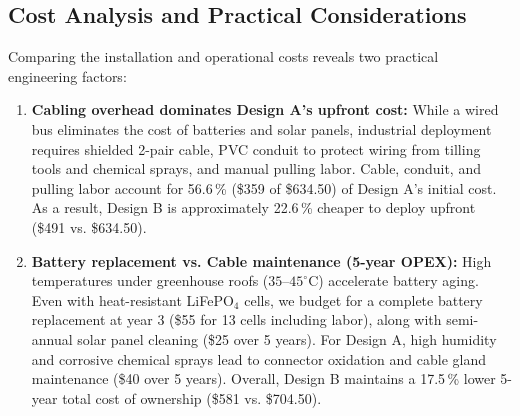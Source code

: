 \documentclass[11pt,a4paper]{report}
\begin{document}
\subsection{Cost Analysis and Practical Considerations}
Comparing the installation and operational costs reveals two practical engineering factors:
\begin{enumerate}
  \item \textbf{Cabling overhead dominates Design A's upfront cost:} While a wired bus eliminates the cost of batteries and solar panels, industrial deployment requires shielded 2-pair cable, PVC conduit to protect wiring from tilling tools and chemical sprays, and manual pulling labor. Cable, conduit, and pulling labor account for 56.6\,\% (\$359 of \$634.50) of Design A's initial cost. As a result, Design B is approximately 22.6\,\% cheaper to deploy upfront (\$491 vs. \$634.50).
  \item \textbf{Battery replacement vs. Cable maintenance (5-year OPEX):} High temperatures under greenhouse roofs ($35$--$45^\circ\text{C}$) accelerate battery aging. Even with heat-resistant LiFePO$_4$ cells, we budget for a complete battery replacement at year 3 (\$55 for 13 cells including labor), along with semi-annual solar panel cleaning (\$25 over 5 years). For Design A, high humidity and corrosive chemical sprays lead to connector oxidation and cable gland maintenance (\$40 over 5 years). Overall, Design B maintains a 17.5\,\% lower 5-year total cost of ownership (\$581 vs. \$704.50).
\end{enumerate}
\end{document}
